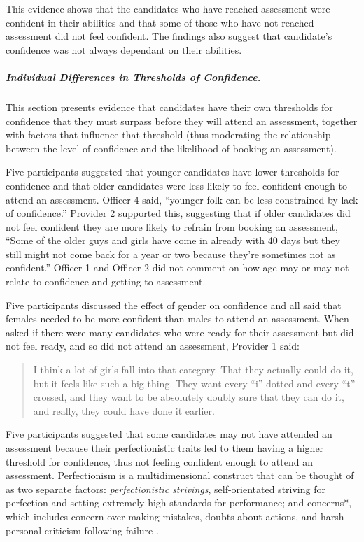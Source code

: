 \documentclass[
  12pt,
  a4paper,
]{book}
\begin{document}
This evidence shows that the candidates who have reached assessment were confident in their abilities and that some of those who have not reached assessment did not feel confident. The findings also suggest that candidate's confidence was not always dependant on their abilities.

\hypertarget{study1-ind-diff-conf}{%
\subparagraph{Individual Differences in Thresholds of Confidence.}\label{study1-ind-diff-conf}}

This section presents evidence that candidates have their own thresholds for confidence that they must surpass before they will attend an assessment, together with factors that influence that threshold (thus moderating the relationship between the level of confidence and the likelihood of booking an assessment).

Five participants suggested that younger candidates have lower thresholds for confidence and that older candidates were less likely to feel confident enough to attend an assessment. Officer 4 said, ``younger folk can be less constrained by lack of confidence.'' Provider 2 supported this, suggesting that if older candidates did not feel confident they are more likely to refrain from booking an assessment, ``Some of the older guys and girls have come in already with 40 days but they still might not come back for a year or two because they're sometimes not as confident.'' Officer 1 and Officer 2 did not comment on how age may or may not relate to confidence and getting to assessment.

Five participants discussed the effect of gender on confidence and all said that females needed to be more confident than males to attend an assessment. When asked if there were many candidates who were ready for their assessment but did not feel ready, and so did not attend an assessment, Provider 1 said:

\begin{quote}
I think a lot of girls fall into that category. That they actually could do it, but it feels like such a big thing. They want every ``i'' dotted and every ``t'' crossed, and they want to be absolutely doubly sure that they can do it, and really, they could have done it earlier.
\end{quote}

Five participants suggested that some candidates may not have attended an assessment because their perfectionistic traits led to them having a higher threshold for confidence, thus not feeling confident enough to attend an assessment. Perfectionism is a multidimensional construct that can be thought of as two separate factors: \emph{perfectionistic strivings}, self-orientated striving for perfection and setting extremely high standards for performance; and concerns*, which includes concern over making mistakes, doubts about actions, and harsh personal criticism following failure \citep[cf.~][]{Stober2006, Stober2017}.
\end{document}

